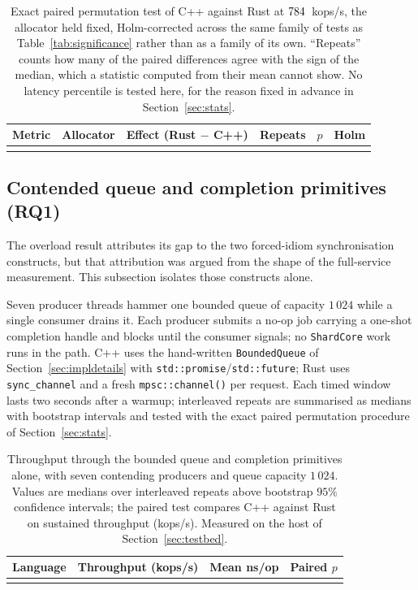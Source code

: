 \documentclass[english,twoside,openright,a4paper,censored,csm,software-track-2020]{HYthesisML}
\begin{document}
\begin{table}
\centering
\small
\caption[Exact paired test past saturation]{Exact paired permutation test of C++ against Rust at
$784$~kops/s, the allocator held fixed, Holm-corrected across the same family of
\NTests{} tests as Table~\ref{tab:significance} rather than as a family of its own. ``Repeats''
counts how many of the \NRepeats{} paired differences agree with the sign of the median, which a
statistic computed from their mean cannot show. No latency percentile is tested here, for the
reason fixed in advance in Section~\ref{sec:stats}.\label{tab:overloadtest}}
\begin{tabular}{@{}l l r c r r@{}}
\hline\hline
Metric & Allocator & Effect (Rust $-$ C++) & Repeats & $p$ & Holm \\
\hline
\\
\hline
\end{tabular}
\end{table}

\subsection{Contended queue and completion primitives (RQ1)}\label{sec:contention}
The overload result attributes its gap to the two forced-idiom synchronisation constructs, but
that attribution was argued from the shape of the full-service measurement. This subsection
isolates those constructs alone.

Seven producer threads hammer one bounded queue of capacity $1\,024$ while a single consumer
drains it. Each producer submits a no-op job carrying a one-shot completion handle and blocks
until the consumer signals; no \texttt{ShardCore} work runs in the path. C++ uses the
hand-written \texttt{BoundedQueue} of Section~\ref{sec:impldetails} with
\texttt{std::promise}/\texttt{std::future}; Rust uses \texttt{sync\_channel} and a fresh
\texttt{mpsc::channel()} per request. Each timed window lasts two seconds after a warmup;
\ContentionRepeats{} interleaved repeats are summarised as medians with bootstrap intervals and
tested with the exact paired permutation procedure of Section~\ref{sec:stats}.

\begin{table}
\centering
\small
\caption[Throughput through the contended synchronisation primitives alone]{Throughput through
the bounded queue and completion primitives alone, with seven contending producers and queue
capacity $1\,024$. Values are medians over \ContentionRepeats{} interleaved repeats above
bootstrap $95\%$ confidence intervals; the paired test compares C++ against Rust on sustained
throughput (kops/s). Measured on the host of Section~\ref{sec:testbed}.\label{tab:contention}}
\begin{tabular}{@{}l r r r@{}}
\hline\hline
Language & Throughput (kops/s) & Mean ns/op & Paired $p$ \\
\hline
\\
\hline
\end{tabular}
\end{table}
\end{document}
